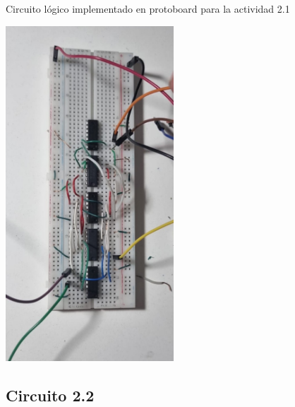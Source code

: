     Circuito lógico implementado en protoboard para la actividad 2.1
    \begin{center}
    \includegraphics[width=6.3cm]{imagenes/Circuito1.jpg}
    \end{center}

\saltoPag

\subsection{Circuito 2.2}

